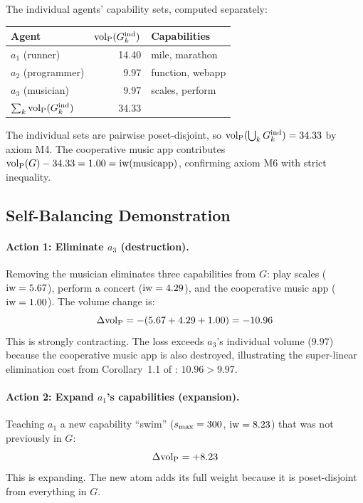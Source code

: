 The individual agents' capability sets, computed separately:

\begin{center}
\begin{tabular}{@{}lrl@{}}
\toprule
\textbf{Agent} & ${\operatorname{vol}_{\mathrm{P}}}(G_{k}^{\mathrm{ind}})$ & \textbf{Capabilities} \\
\midrule
$a_1$ (runner)     & 14.40 & mile, marathon \\
$a_2$ (programmer) &  9.97 & function, webapp \\
$a_3$ (musician)   &  9.97 & scales, perform \\
\midrule
$\sum_k {\operatorname{vol}_{\mathrm{P}}}(G_{k}^{\mathrm{ind}})$ & 34.33 & \\
\bottomrule
\end{tabular}
\end{center}

The individual sets are pairwise poset-disjoint, so ${\operatorname{vol}_{\mathrm{P}}}(\bigcup_k
G_{k}^{\mathrm{ind}}) = 34.33$ by axiom M4. The cooperative music app contributes
${\operatorname{vol}_{\mathrm{P}}}(G) - 34.33 = 1.00 = \operatorname{iw}(\text{musicapp})$, confirming axiom M6 with
strict inequality.

\subsection{Self-Balancing Demonstration}

\paragraph{Action 1: Eliminate $a_3$ (destruction).} Removing the musician
eliminates three capabilities from $G$: play scales ($\operatorname{iw} = 5.67$), perform a
concert ($\operatorname{iw} = 4.29$), and the cooperative music app ($\operatorname{iw} = 1.00$). The
volume change is:
\[
\Delta {\operatorname{vol}_{\mathrm{P}}} = -(5.67 + 4.29 + 1.00) = -10.96
\]
This is strongly contracting. The loss exceeds $a_3$'s individual volume
($9.97$) because the cooperative music app is also destroyed, illustrating the
super-linear elimination cost from Corollary~1.1 of \citet{lasser2026gfm}:
$10.96 > 9.97$.

\paragraph{Action 2: Expand $a_1$'s capabilities (expansion).} Teaching $a_1$
a new capability ``swim'' ($s_{\mathrm{max}} = 300$, $\operatorname{iw} = 8.23$) that was not
previously in $G$:
\[
\Delta {\operatorname{vol}_{\mathrm{P}}} = +8.23
\]
This is expanding. The new atom adds its full weight because it is
poset-disjoint from everything in $G$.

